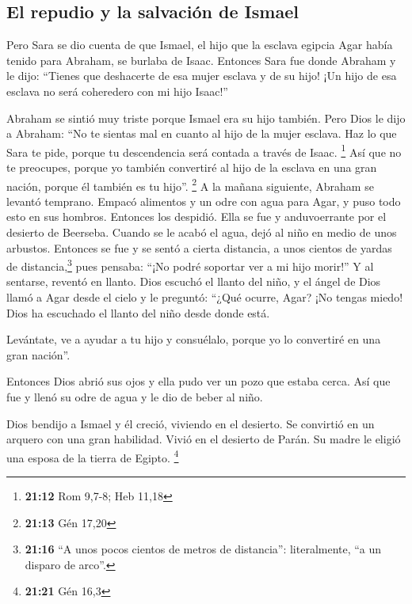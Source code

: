\hypertarget{el-repudio-y-la-salvaciuxf3n-de-ismael}{%
\subsection{El repudio y la salvación de
Ismael}\label{el-repudio-y-la-salvaciuxf3n-de-ismael}}

 Pero Sara se dio cuenta de que Ismael, el hijo que la
esclava egipcia Agar había tenido para Abraham, se burlaba de Isaac.
 Entonces Sara fue donde Abraham y le dijo: ``Tienes que
deshacerte de esa mujer esclava y de su hijo! ¡Un hijo de esa esclava no
será coheredero con mi hijo Isaac!''

 Abraham se sintió muy triste porque Ismael era su hijo
también.  Pero Dios le dijo a Abraham: ``No te sientas
mal en cuanto al hijo de la mujer esclava. Haz lo que Sara te pide,
porque tu descendencia será contada a través de Isaac. \footnote{\textbf{21:12}
  Rom 9,7-8; Heb 11,18}  Así que no te preocupes, porque
yo también convertiré al hijo de la esclava en una gran nación, porque
él también es tu hijo''. \footnote{\textbf{21:13} Gén 17,20}
 A la mañana siguiente, Abraham se levantó temprano.
Empacó alimentos y un odre con agua para Agar, y puso todo esto en sus
hombros. Entonces los despidió. Ella se fue y anduvoerrante por el
desierto de Beerseba.  Cuando se le acabó el agua, dejó
al niño en medio de unos arbustos.  Entonces se fue y se
sentó a cierta distancia, a unos cientos de yardas de
distancia,\footnote{\textbf{21:16} ``A unos pocos cientos de metros de
  distancia'': literalmente, ``a un disparo de arco''.} pues pensaba:
``¡No podré soportar ver a mi hijo morir!'' Y al sentarse, reventó en
llanto.  Dios escuchó el llanto del niño, y el ángel de
Dios llamó a Agar desde el cielo y le preguntó: ``¿Qué ocurre, Agar? ¡No
tengas miedo! Dios ha escuchado el llanto del niño desde donde está.

 Levántate, ve a ayudar a tu hijo y consuélalo, porque yo
lo convertiré en una gran nación''.

 Entonces Dios abrió sus ojos y ella pudo ver un pozo que
estaba cerca. Así que fue y llenó su odre de agua y le dio de beber al
niño.

 Dios bendijo a Ismael y él creció, viviendo en el
desierto. Se convirtió en un arquero con una gran habilidad.
 Vivió en el desierto de Parán. Su madre le eligió una
esposa de la tierra de Egipto. \footnote{\textbf{21:21} Gén 16,3}

